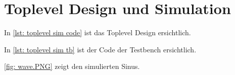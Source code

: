 \documentclass[./\jobname.tex]{subfiles}
\begin{document}
\section{Toplevel Design und Simulation}
%
In \autoref{lst: toplevel sim code} ist das Toplevel Design ersichtlich.
%

%
In \autoref{lst: toplevel sim tb} ist der Code der Testbench ersichtlich. 
%

%
\autoref{fig: wave.PNG} zeigt den simulierten Sinus.
%
\begin{figure}[H]
	\centering
	\noindent{}
	\label{fig: wave.PNG}
\end{figure}
%
%
%
\end{document}
